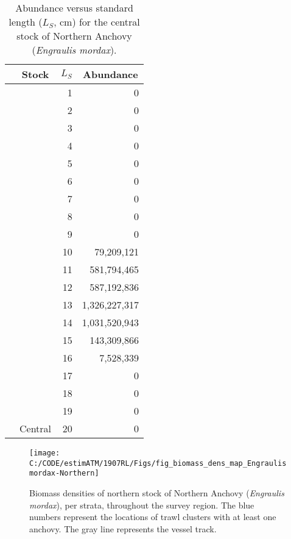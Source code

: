 \documentclass[]{article}
\begin{document}
\begin{longtable}{>{\em}l|l|r|r}
\caption{\label{tab:l-freq-summ-anch-c}Abundance versus standard length (\(L_S\), cm) for the central stock of Northern Anchovy (\emph{Engraulis mordax}).}\\
\hline
\multicolumn{1}{c}{Species} & \multicolumn{1}{c}{Stock} & \multicolumn{1}{c}{$L_S$} & \multicolumn{1}{c}{Abundance}\\
\hline
\rowcolor{gray!6}   &  & 1 & 0\\
\cline{3-4}
 &  & 2 & 0\\
\cline{3-4}
\rowcolor{gray!6}   &  & 3 & 0\\
\cline{3-4}
 &  & 4 & 0\\
\cline{3-4}
\rowcolor{gray!6}   &  & 5 & 0\\
\cline{3-4}
 &  & 6 & 0\\
\cline{3-4}
\rowcolor{gray!6}   &  & 7 & 0\\
\cline{3-4}
 &  & 8 & 0\\
\cline{3-4}
\rowcolor{gray!6}   &  & 9 & 0\\
\cline{3-4}
 &  & 10 & 79,209,121\\
\cline{3-4}
\rowcolor{gray!6}   &  & 11 & 581,794,465\\
\cline{3-4}
 &  & 12 & 587,192,836\\
\cline{3-4}
\rowcolor{gray!6}   &  & 13 & 1,326,227,317\\
\cline{3-4}
 &  & 14 & 1,031,520,943\\
\cline{3-4}
\rowcolor{gray!6}   &  & 15 & 143,309,866\\
\cline{3-4}
 &  & 16 & 7,528,339\\
\cline{3-4}
\rowcolor{gray!6}   &  & 17 & 0\\
\cline{3-4}
 &  & 18 & 0\\
\cline{3-4}
\rowcolor{gray!6}   &  & 19 & 0\\
\cline{3-4}
\multirow{-20}{*}{\raggedright\arraybackslash Engraulis mordax} & \multirow{-20}{*}{\raggedright\arraybackslash Central} & 20 & 0\\
\hline
\end{longtable}

\newpage



\begin{figure}[H]

{\centering \texttt{[image: C:/CODE/estimATM/1907RL/Figs/fig\_biomass\_dens\_map\_Engraulis mordax-Northern]} 

}

\caption{Biomass densities of northern stock of Northern Anchovy (\emph{Engraulis mordax}), per strata, throughout the survey region. The blue numbers represent the locations of trawl clusters with at least one anchovy. The gray line represents the vessel track.}\label{fig:biom-dens-anch-n}
\end{figure}
\end{document}
